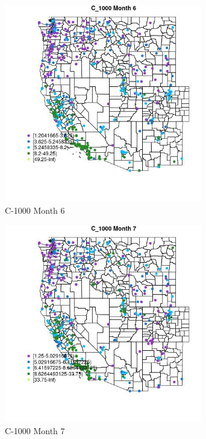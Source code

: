 \begin{figure} 
\centering  
\includegraphics[width=0.77\textwidth]{Code_Outputs/ML_input_report_ML_input_PM25_Step5_part_d_de_duplicated_aves_ML_input_MapObsMo6C_1000.jpg} 
\caption{\label{fig:ML_input_report_ML_input_PM25_Step5_part_d_de_duplicated_aves_ML_inputMapObsMo6C_1000}C-1000 Month 6} 
\end{figure} 
 

\begin{figure} 
\centering  
\includegraphics[width=0.77\textwidth]{Code_Outputs/ML_input_report_ML_input_PM25_Step5_part_d_de_duplicated_aves_ML_input_MapObsMo7C_1000.jpg} 
\caption{\label{fig:ML_input_report_ML_input_PM25_Step5_part_d_de_duplicated_aves_ML_inputMapObsMo7C_1000}C-1000 Month 7} 
\end{figure} 
 

